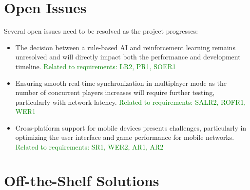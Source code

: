 \documentclass[12pt]{article}
\newcommand{\added}[1]{\textcolor{green}{#1}}
\begin{document}
\section{Open Issues}
Several open issues need to be resolved as the project progresses:
\begin{itemize}
    \item The decision between a rule-based AI and reinforcement learning remains unresolved and will directly impact both the performance and development timeline. 
    \added{Related to requirements: LR2, PR1, SOER1}

    \item Ensuring smooth real-time synchronization in multiplayer mode as the number of concurrent players increases will require further testing, particularly with network latency. 
    \added{Related to requirements: SALR2, ROFR1, WER1}

    \item Cross-platform support for mobile devices presents challenges, particularly in optimizing the user interface and game performance for mobile networks. 
    \added{Related to requirements: SR1, WER2, AR1, AR2}
\end{itemize}

\section{Off-the-Shelf Solutions}
\end{document}
